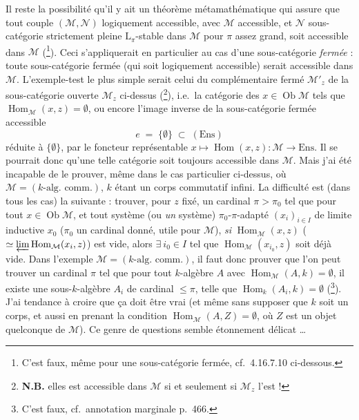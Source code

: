 \documentclass[11pt]{article}
\newcommand{\printedpage}[1]{\marginpar{\footnotesize p.~#1}}
\newcommand{\msp}[1]{\marginpar{\footnotesize [#1]}}
\newcommand{\Hom}{\operatorname{Hom}}
\newcommand{\Ob}{\operatorname{Ob}}
\newcommand{\Ens}{\mathrm{Ens}}
\begin{document}
Il reste la possibilité qu'il y ait un théorème métamathématique qui assure que tout couple $(\mathcal{M},\mathcal{N})$ logiquement accessible, avec $\mathcal{M}$ accessible, et $\mathcal{N}$ sous-catégorie strictement pleine $\mathrm{L}_\pi$-stable dans $\mathcal{M}$ pour $\pi$ assez grand, soit accessible dans $\mathcal{M}$ (\footnote[188]{C'est faux, même pour une sous-catégorie fermée, cf.\ 4.16.7.10 ci-dessous.}). Ceci s'appliquerait en particulier au cas d'une sous-catégorie \textit{fermée} : toute sous-catégorie fermée (qui soit logiquement accessible) serait accessible dans $\mathcal{M}$. L'exemple-test le plus simple serait celui du complémentaire fermé $\mathcal{M}'_z$ de la sous-catégorie ouverte $\mathcal{M}_z$ ci-dessus (\footnote[189]{\textbf{N.B.} elles est accessible dans $\mathcal{M}$ si et seulement si $\mathcal{M}_z$ l'est ! %
}), i.e.\ la catégorie des $x \in \Ob\mathcal{M}$ tels que $\Hom_{\mathcal{M}}(x,z) = \emptyset$, ou encore
\msp{467}
l'image inverse de la sous-catégorie fermée accessible
\[
e \;=\; \{\emptyset\} \;\subset\; (\Ens)
\]
réduite à $\{\emptyset\}$, par le foncteur représentable $x \longmapsto \Hom(x,z) : \mathcal{M} \longrightarrow \Ens$. Il se pourrait donc qu'une telle catégorie soit toujours accessible dans $\mathcal{M}$. Mais j'ai été incapable de le
\printedpage{181}
prouver, même dans le cas particulier ci-dessus, où $\mathcal{M} = (k\text{-alg.\ comm.})$, $k$ étant un corps commutatif infini. La difficulté est (dans tous les cas) la suivante : trouver, pour $z$ fixé, un cardinal $\pi > \pi_0$ tel que pour tout $x \in \Ob\mathcal{M}$, et tout système (ou \textit{un} système) $\pi_0$-$\pi$-adapté $(x_i)_{i\in I}$ de limite inductive $x_0$ ($\pi_0$ un cardinal donné, utile pour $\mathcal{M}$), \textit{si} $\Hom_{\mathcal{M}}(x,z)$ ($\simeq \varprojlim \Hom_{\mathcal{M}}(x_i,z)$) est vide, alors $\exists\ i_0 \in I$ tel que $\Hom_{\mathcal{M}}(x_{i_0},z)$ soit déjà vide. Dans l'exemple $\mathcal{M} = (k\text{-alg.\ comm.})$, il faut donc prouver que l'on peut trouver un cardinal $\pi$
tel que pour tout $k$-algèbre $A$ avec $\Hom_{\mathcal{M}}(A,k) = \emptyset$, il existe une sous-$k$-algèbre $A_i$ de %
cardinal $\leqslant \pi$, telle que $\Hom_k(A_i,k) = \emptyset$ (\footnote[190]{C'est faux, cf.\ annotation marginale p.~466.}). J'ai tendance à croire que ça doit être vrai (et même sans
\msp{468}
supposer que $k$ soit un corps, et aussi en prenant la condition $\Hom_{\mathcal{M}}(A,Z) = \emptyset$, où $Z$ est un objet quelconque de $\mathcal{M}$). Ce genre de questions semble étonnement délicat \dots %
\end{document}
